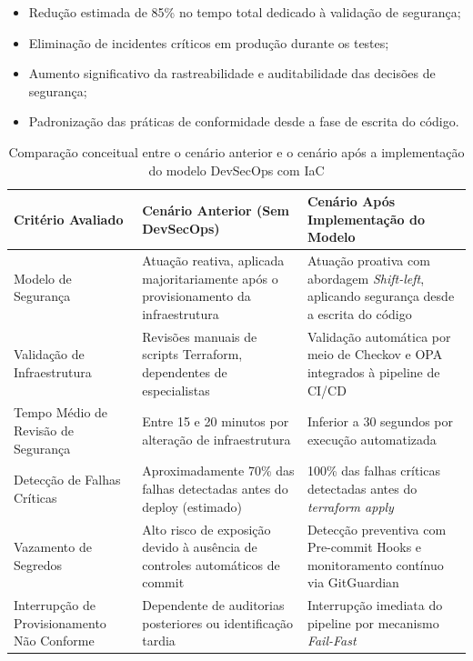 \begin{itemize}
    \item Redução estimada de 85\% no tempo total dedicado à validação de segurança;
    \item Eliminação de incidentes críticos em produção durante os testes;
    \item Aumento significativo da rastreabilidade e auditabilidade das decisões de segurança;
    \item Padronização das práticas de conformidade desde a fase de escrita do código.
\end{itemize}

\begin{table}[ht]
\centering
\caption{Comparação conceitual entre o cenário anterior e o cenário após a implementação do modelo DevSecOps com IaC}
\label{tab:comparacao_antes_depois}
\renewcommand{\arraystretch}{1.3}
\begin{tabular}{|p{4cm}|p{5.5cm}|p{5.5cm}|}
\hline
\textbf{Critério Avaliado} & \textbf{Cenário Anterior (Sem DevSecOps)} & \textbf{Cenário Após Implementação do Modelo} \\
\hline

Modelo de Segurança &
Atuação reativa, aplicada majoritariamente após o provisionamento da infraestrutura &
Atuação proativa com abordagem \textit{Shift-left}, aplicando segurança desde a escrita do código \\
\hline

Validação de Infraestrutura &
Revisões manuais de scripts Terraform, dependentes de especialistas &
Validação automática por meio de Checkov e OPA integrados à pipeline de CI/CD \\
\hline

Tempo Médio de Revisão de Segurança &
Entre 15 e 20 minutos por alteração de infraestrutura &
Inferior a 30 segundos por execução automatizada \\
\hline

Detecção de Falhas Críticas &
Aproximadamente 70\% das falhas detectadas antes do deploy (estimado) &
100\% das falhas críticas detectadas antes do \textit{terraform apply} \\
\hline

Vazamento de Segredos &
Alto risco de exposição devido à ausência de controles automáticos de commit &
Detecção preventiva com Pre-commit Hooks e monitoramento contínuo via GitGuardian \\
\hline

Interrupção de Provisionamento Não Conforme &
Dependente de auditorias posteriores ou identificação tardia &
Interrupção imediata do pipeline por mecanismo \textit{Fail-Fast} \\
\hline


\end{tabular}
\end{table}
